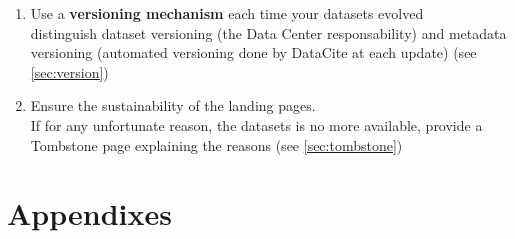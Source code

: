 \documentclass[11pt,a4paper]{ivoa}
\begin{document}
\begin{enumerate}
	\item Use a \textbf{versioning mechanism} each time your datasets evolved\\
	distinguish dataset versioning (the Data Center responsability) and metadata versioning (automated versioning done by DataCite at each update) (see \ref{sec:version})
	\item Ensure the sustainability of the landing pages.\\
	If for any unfortunate reason, the datasets is no more available, provide a Tombstone page explaining the reasons (see \ref{sec:tombstone})
\end{enumerate}



\section{Appendixes}

%

	
\end{document}
